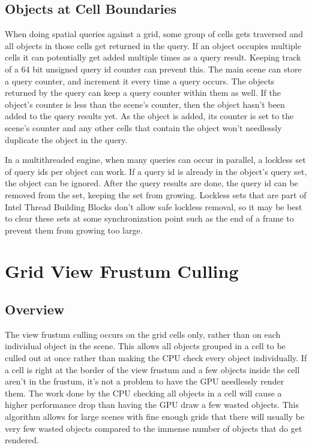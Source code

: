 \documentclass[12pt]{ucthesis}
\begin{document}
\subsection{Objects at Cell Boundaries}
\label{objects-at-cell-boundaries}
When doing spatial queries against a grid, some group of cells gets traversed and all objects in those cells get returned in the query.
If an object occupies multiple cells it can potentially get added multiple times as a query result.
Keeping track of a 64 bit unsigned query id counter can prevent this.
The main scene can store a query counter, and increment it every time a query occurs.
The objects returned by the query can keep a query counter within them as well.
If the object's counter is less than the scene's counter, then the object hasn't been added to the query results yet.
As the object is added, its counter is set to the scene's counter and any other cells that contain the object won't needlessly duplicate the object in the query.

In a multithreaded engine, when many queries can occur in parallel, a lockless set of query ids per object can work.
If a query id is already in the object's query set, the object can be ignored.
After the query results are done, the query id can be removed from the set, keeping the set from growing.
Lockless sets that are part of Intel Thread Building Blocks don't allow safe lockless removal, so it may be best to clear these sets at some synchronization point such as the end of a frame to prevent them from growing too large.\cite{tbb}

\section{Grid View Frustum Culling}
\label{grid-view-frustum-culling}

\subsection{Overview}
\label{Overview}
The view frustum culling occurs on the grid cells only, rather than on each individual object in the scene.
This allows all objects grouped in a cell to be culled out at once rather than making the CPU check every object individually.
If a cell is right at the border of the view frustum and a few objects inside the cell aren't in the frustum, it's not a problem to have the GPU needlessly render them.
The work done by the CPU checking all objects in a cell will cause a higher performance drop than having the GPU draw a few wasted objects.
This algorithm allows for large scenes with fine enough grids that there will usually be very few wasted objects compared to the immense number of objects that do get rendered.
\end{document}
